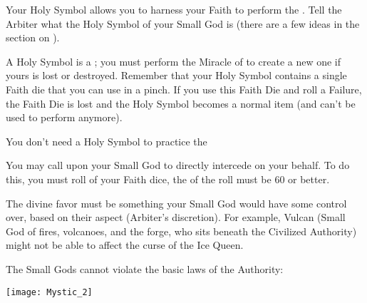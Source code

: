 {

Your Holy Symbol allows you to harness your Faith to perform the .  Tell the Arbiter what the Holy Symbol of your Small God is (there are a few ideas in the section on ).

A Holy Symbol is a ; you must perform the Miracle of  to create a new one if yours is lost or destroyed.  Remember that your Holy Symbol contains a single Faith die that you can use in a pinch.  If you use this Faith Die and roll a Failure, the Faith Die is lost and the Holy Symbol becomes a normal item (and can't be used to perform  anymore).

You don't need a Holy Symbol to practice the 



You may call upon your Small God to directly intercede on your behalf.  To do this, you must roll  of your Faith dice, the \SUMDICE of the roll must be 60 or better.

The divine favor must be something your Small God would have some control over, based on their aspect (Arbiter's discretion).  For example, Vulcan (Small God of fires, volcanoes, and the forge, who sits beneath the Civilized Authority) might not be able to affect the curse of the Ice Queen.  

The Small Gods cannot violate the basic laws of the Authority:

  \begin{center}
  \texttt{[image: Mystic\_2]}
  \end{center}

}
